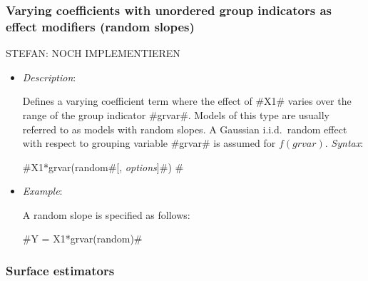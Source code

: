 




\subsubsection*{Varying coefficients with unordered group indicators as effect modifiers
(random slopes)}

STEFAN: NOCH IMPLEMENTIEREN

\begin{itemize}
\item[] {\em Description}:

Defines a varying coefficient term where the effect of #X1# varies
over the range of the group indicator #grvar#. Models of this type
are usually referred to as models with random slopes. A Gaussian
i.i.d.~random effect with respect to grouping variable #grvar# is
assumed for $f(grvar)$.
{\em Syntax}:

#X1*grvar(random#[, {\em options}]#) #
\item[] {\em Example}:

A random slope  is specified as follows:

#Y = X1*grvar(random)#
\end{itemize}


\subsubsection*{Surface estimators}

